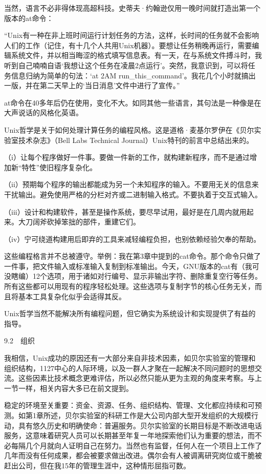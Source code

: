 \documentclass[a4paper,12pt,UTF8,twoside]{ctexbook}
\begin{document}
{{当然，语言不必非得体现高超科技。史蒂夫·约翰逊仅用一晚时间就打造出第一个版本的at命令：

“Unix有一种在非上班时间运行计划任务的方法，这样，长时间的任务就不会影响人们的工作（记住，有十几个人共用Unix机器）。要想让任务稍晚再运行，需要编辑系统文件，并以相当晦涩的格式填写信息表。有一天，在与系统文件搏斗时，我听到自己喃喃自语‘我想让这个任务在凌晨2点运行’。突然，我意识到，可以将任务信息归纳为简单的句法：‘at 2AM run_this_command’。我花几个小时就搞出一版，并在第二天早上的‘当日消息’文件中进行了宣传。”



at命令在40多年后仍在使用，变化不大。如同其他一些语言，其句法是一种像是在大声说话的风格化英语。

Unix哲学是关于如何处理计算任务的编程风格。这是道格·麦基尔罗伊在《贝尔实验室技术杂志》（Bell Labs Technical Journal）Unix特刊的前言中总结出来的。

（i）让每个程序做好一件事。要做一件新的工作，就构建新程序，而不是通过增加新“特性”使旧程序复杂化。

（ii）预期每个程序的输出都能成为另一个未知程序的输入。不要用无关的信息来干扰输出。避免使用严格的分栏对齐或二进制输入格式。不要执着于交互式输入。

（iii）设计和构建软件，甚至是操作系统，要尽早试用，最好是在几周内就用起来。大刀阔斧砍掉笨拙的部件，重建它们。

（iv）宁可绕道构建用后即弃的工具来减轻编程负担，也别依赖经验欠奉的帮助。

这些编程格言并不总被遵守。举例：我在第3章中提到的cat命令。那个命令只做了一件事，把文件输入或标准输入复制到标准输出。今天，GNU版本的cat有（我可没瞎编）12个选项，用于诸如对行编号、显示非输出字符、删除重复空行等任务。所有这些都可以用现有的程序轻松处理。这些选项与复制字节的核心任务无关，而且将基本工具复杂化似乎会适得其反。

Unix哲学当然不能解决所有编程问题，但它确实为系统设计和实现提供了有益的指导。





9.2　组织


我相信，Unix成功的原因还有一大部分来自非技术因素，如贝尔实验室的管理和组织结构，1127中心的人际环境，以及一群人才聚在一起解决不同问题时的思想交流。这些因素比技术概念更难评估，所以必然只能从更为主观的角度来考察。与上一节一样，相关内容大多已在前文提到。

稳定的环境至关重要：资金、资源、任务、组织结构、管理、文化都应持续和可预测。如第1章所述，贝尔实验室的科研工作是大公司内部大型开发组织的大规模行动，具有悠久历史和明确使命：普遍服务。贝尔实验室的长期目标是不断改进电话服务，这意味着研究人员可以长期甚至年复一年地探索他们认为重要的想法，而不必每隔几个月就向人证明自己在努力。当然也有监督，任何人在一个项目上工作了几年而没有任何成果，都会被要求做出改进。偶尔会有人被调离研究岗位或干脆被赶出公司，但在我15年的管理生涯中，这种情形屈指可数。

}}
\end{document}
